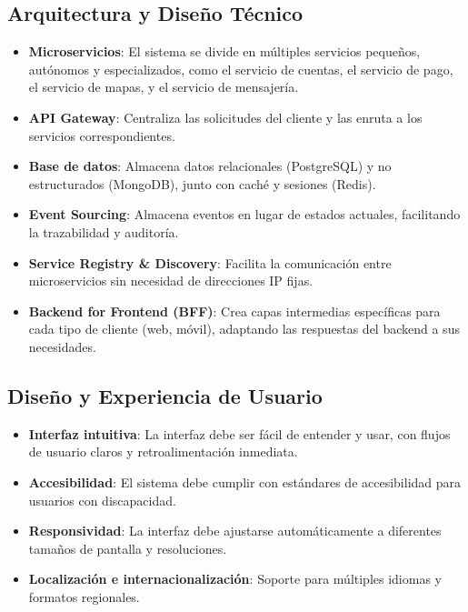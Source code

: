 	\subsection*{Arquitectura y Diseño Técnico}
		\begin{itemize}
			\item \textbf{Microservicios}: El sistema se divide en múltiples servicios pequeños, autónomos y especializados, como el servicio de cuentas, el servicio de pago, el servicio de mapas, y el servicio de mensajería.
			\item \textbf{API Gateway}: Centraliza las solicitudes del cliente y las enruta a los servicios correspondientes.
			\item \textbf{Base de datos}: Almacena datos relacionales (PostgreSQL) y no estructurados (MongoDB), junto con caché y sesiones (Redis).
			\item \textbf{Event Sourcing}: Almacena eventos en lugar de estados actuales, facilitando la trazabilidad y auditoría.
			\item \textbf{Service Registry \& Discovery}: Facilita la comunicación entre microservicios sin necesidad de direcciones IP fijas.
			\item \textbf{Backend for Frontend (BFF)}: Crea capas intermedias específicas para cada tipo de cliente (web, móvil), adaptando las respuestas del backend a sus necesidades.
		\end{itemize}
	
	\subsection*{Diseño y Experiencia de Usuario}
		\begin{itemize}
			\item \textbf{Interfaz intuitiva}: La interfaz debe ser fácil de entender y usar, con flujos de usuario claros y retroalimentación inmediata.
			\item \textbf{Accesibilidad}: El sistema debe cumplir con estándares de accesibilidad para usuarios con discapacidad.
			\item \textbf{Responsividad}: La interfaz debe ajustarse automáticamente a diferentes tamaños de pantalla y resoluciones.
			\item \textbf{Localización e internacionalización}: Soporte para múltiples idiomas y formatos regionales.
		\end{itemize}
		
